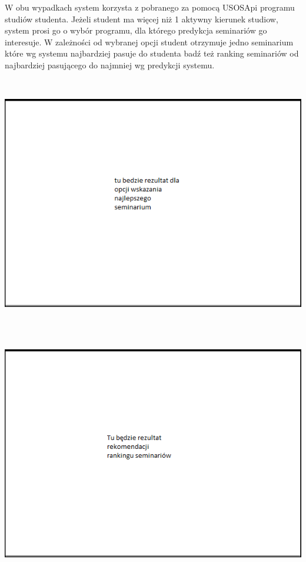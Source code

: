 \documentclass[licencjacka]{pracamgr}
\begin{document}
W obu wypadkach system korzysta z pobranego za pomocą USOSApi programu studiów studenta. Jeżeli student ma więcej niż 1 aktywny kierunek studiow, system prosi go o wybór programu, dla którego predykcja seminariów go interesuje. W zależności od wybranej opcji student otrzymuje jedno seminarium które wg systemu najbardziej pasuje do studenta badź też ranking seminariów od najbardziej pasującego do najmniej wg predykcji systemu. \par
~\\
\begin{minipage}{\linewidth}
	\centering
           \includegraphics[scale=0.7]{bestsem.png}
\end{minipage} \\  
~\\
\begin{minipage}{\linewidth}
	\centering
           \includegraphics[scale=0.7]{ranksem.png}
\end{minipage} \\ 
\end{document}

